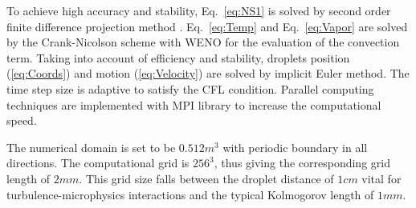 \documentclass[12pt]{article}
\newcommand{\Eq}[1]{Eq.~\eqref{#1}} \newcommand{\Fig}[1]{Figure~\ref{#1}}
\begin{document}
To achieve high accuracy and stability, \Eq{eq:NS1} is 
solved by second order finite difference projection method 
\cite{Projection01}. 
\Eq{eq:Temp} and \Eq{eq:Vapor} are solved by the Crank-Nicolson scheme with WENO for the evaluation of the convection term. Taking into account of efficiency and stability, droplets position (\ref{eq:Coords}) and motion (\ref{eq:Velocity}) are solved by implicit Euler method. The time step size is adaptive to satisfy the CFL condition. Parallel computing techniques are implemented with MPI library to increase the computational speed.

The numerical domain is set to be $0.512m^{3}$ with periodic boundary
in all directions. The computational grid is $256^{3}$, thus
giving the corresponding grid length of $2mm$. This grid size falls
between the droplet distance of $1cm$ vital for turbulence-microphysics 
interactions and the typical Kolmogorov length of $1mm$.
\end{document}
